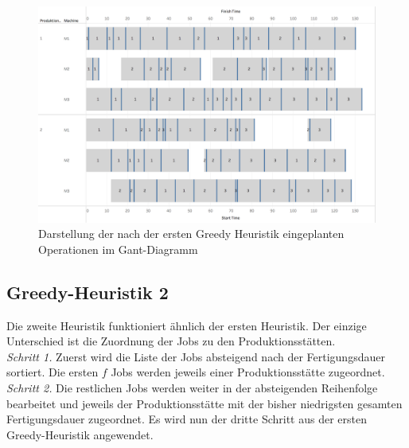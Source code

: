 \documentclass[final, english, ngerman, a4paper, 12pt, %
numbers=noenddot,
cd=true,
cdfont=false,cdfont=nohead,cdfont=nodin,
cdmath=false,
cdhead=false,
cdfoot=true,
cdcover=monochrome,
cdgeometry=symmetric,
declaration=heading,
declaration=notoc,
abstract=heading,
]{tudscrreprt}
\begin{document}
\begin{figure}[H]
	\centering
	\includegraphics[width=\textwidth]{./settings/gh1}
	\caption[Interaktives Beispiel - Einplanung nach der ersten Greedy Heuristik]{Darstellung der nach der ersten Greedy Heuristik eingeplanten Operationen im Gant-Diagramm\footnotemark}\label{fig:gh1}
\end{figure}

\subsection{Greedy-Heuristik 2}

Die zweite Heuristik funktioniert ähnlich der ersten Heuristik. Der einzige Unterschied ist die Zuordnung der Jobs zu den Produktionsstätten. \\

\noindent
\textit{Schritt 1.} Zuerst wird die Liste der Jobs absteigend nach der Fertigungsdauer sortiert. Die ersten $f$ Jobs werden jeweils einer Produktionsstätte zugeordnet. \\

\noindent
\textit{Schritt 2.} Die restlichen Jobs werden weiter in der absteigenden Reihenfolge bearbeitet und jeweils der Produktionsstätte mit der bisher niedrigsten gesamten Fertigungsdauer zugeordnet. Es wird nun der dritte Schritt aus der ersten Greedy-Heuristik angewendet. \\
\end{document}
